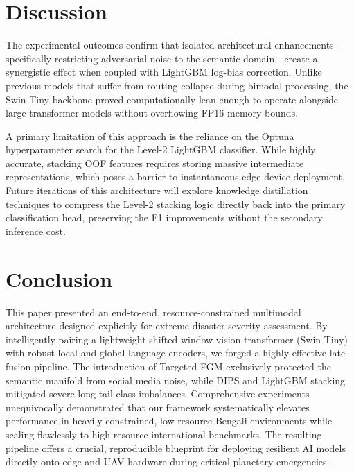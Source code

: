 \documentclass[twoside,twocolumn,10pt]{article}
\begin{document}
\section{Discussion}
\fontsize{11}{13}\selectfont

The experimental outcomes confirm that isolated architectural enhancements—specifically restricting adversarial noise to the semantic domain—create a synergistic effect when coupled with LightGBM log-bias correction. Unlike previous models that suffer from routing collapse during bimodal processing, the Swin-Tiny backbone proved computationally lean enough to operate alongside large transformer models without overflowing FP16 memory bounds. 

A primary limitation of this approach is the reliance on the Optuna hyperparameter search for the Level-2 LightGBM classifier. While highly accurate, stacking OOF features requires storing massive intermediate representations, which poses a barrier to instantaneous edge-device deployment. Future iterations of this architecture will explore knowledge distillation techniques to compress the Level-2 stacking logic directly back into the primary classification head, preserving the F1 improvements without the secondary inference cost.

\section{Conclusion}
\fontsize{11}{13}\selectfont

This paper presented an end-to-end, resource-constrained multimodal architecture designed explicitly for extreme disaster severity assessment. By intelligently pairing a lightweight shifted-window vision transformer (Swin-Tiny) with robust local and global language encoders, we forged a highly effective late-fusion pipeline. The introduction of Targeted FGM exclusively protected the semantic manifold from social media noise, while DIPS and LightGBM stacking mitigated severe long-tail class imbalances. Comprehensive experiments unequivocally demonstrated that our framework systematically elevates performance in heavily constrained, low-resource Bengali environments while scaling flawlessly to high-resource international benchmarks. The resulting pipeline offers a crucial, reproducible blueprint for deploying resilient AI models directly onto edge and UAV hardware during critical planetary emergencies.

\vspace{0.5cm}
\end{document}
